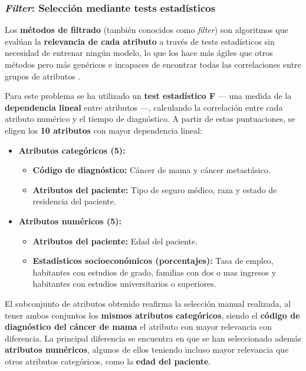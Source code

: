 \subsubsection{\textit{Filter}: Selección mediante tests estadísticos}

Los \textbf{métodos de filtrado} (también conocidos como \textit{filter}) son algoritmos que evalúan la \textbf{relevancia de cada atributo} a través de tests estadísticos sin necesidad de entrenar ningún modelo, lo que los hace más ágiles que otros métodos pero más genéricos e incapaces de encontrar todas las correlaciones entre grupos de atributos \cite{featureselection}.

Para este problema se ha utilizado un \textbf{test estadístico F} --- una medida de la \textbf{dependencia lineal} entre atributos ---, calculando la correlación entre cada atributo numérico y el tiempo de diagnóstico. A partir de estas puntuaciones, se eligen los \textbf{10 atributos} con mayor dependencia lineal:

\begin{itemize}[parsep=1pt, itemsep=1pt, topsep=4pt]
	\item \textbf{Atributos categóricos (5):} 
	\begin{itemize}[parsep=1pt, itemsep=1pt, topsep=4pt]
		\item \textbf{Código de diagnóstico:} Cáncer de mama y cáncer metastásico.
		\item \textbf{Atributos del paciente:} Tipo de seguro médico, raza y estado de residencia del paciente.
	\end{itemize}
	\item \textbf{Atributos numéricos (5):}
	\begin{itemize}[parsep=1pt, itemsep=1pt, topsep=4pt]
		\item \textbf{Atributos del paciente:} Edad del paciente.
		\item \textbf{Estadísticos socioeconómicos (porcentajes):} Tasa de empleo, habitantes con estudios de grado, familias con dos o mas ingresos y habitantes con estudios universitarios o superiores.
	\end{itemize}
\end{itemize}

El subconjunto de atributos obtenido reafirma la selección manual realizada, al tener ambos conjuntos los \textbf{mismos atributos categóricos}, siendo el \textbf{código de diagnóstico del cáncer de mama} el atributo con mayor relevancia con diferencia. La principal diferencia se encuentra en que se han seleccionado además \textbf{atributos numéricos}, algunos de ellos teniendo incluso mayor relevancia que otros atributos categóricos, como la \textbf{edad del paciente}.


